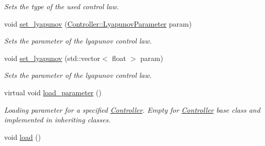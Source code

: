 \begin{DoxyCompactItemize}
\begin{DoxyCompactList}\small\item\em Sets the type of the used control law. \end{DoxyCompactList}\item 
void \hyperlink{classController_ae38ab0dc31dde6fcc5c7df1ed1776cb0}{set\+\_\+lyapunov} (\hyperlink{structController_1_1LyapunovParameter}{Controller\+::\+Lyapunov\+Parameter} param)
\begin{DoxyCompactList}\small\item\em Sets the parameter of the lyapunov control law. \end{DoxyCompactList}\item 
void \hyperlink{classController_afb2d5fec93db7b68a16767823f4c1675}{set\+\_\+lyapunov} (std\+::vector$<$ float $>$ param)
\begin{DoxyCompactList}\small\item\em Sets the parameter of the lyapunov control law. \end{DoxyCompactList}\item 
virtual void \hyperlink{classController_a0758387181bc5902176813cc686cb088}{load\+\_\+parameter} ()\hypertarget{classController_a0758387181bc5902176813cc686cb088}{}\label{classController_a0758387181bc5902176813cc686cb088}

\begin{DoxyCompactList}\small\item\em Loading parameter for a specified \hyperlink{classController}{Controller}. Empty for \hyperlink{classController}{Controller} base class and implemented in inheriting classes. \end{DoxyCompactList}\item 
void \hyperlink{classController_a55c77d2e41634c9b21543647f74eec4c}{load} ()\hypertarget{classController_a55c77d2e41634c9b21543647f74eec4c}{}\label{classController_a55c77d2e41634c9b21543647f74eec4c}


\end{DoxyCompactItemize}
